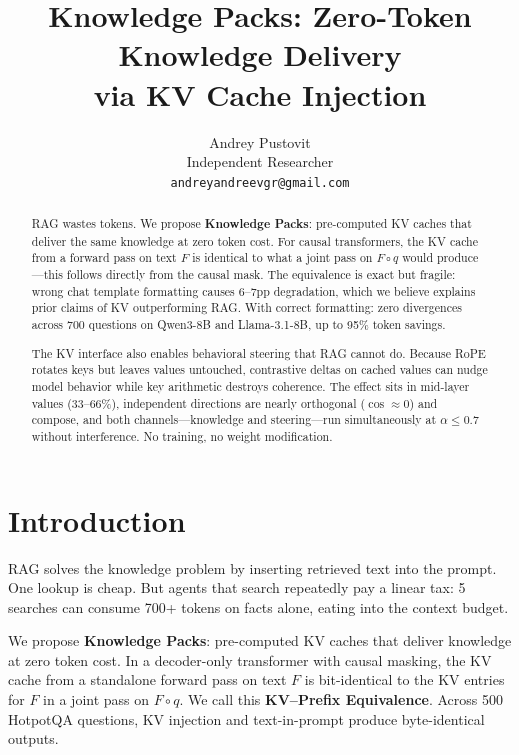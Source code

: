 \documentclass{article}
\title{Knowledge Packs: Zero-Token Knowledge Delivery\\via KV Cache Injection}
\author{
  Andrey Pustovit\\
  Independent Researcher\\
  \texttt{andreyandreevgr@gmail.com}
}
\begin{document}
\maketitle
{}

\begin{abstract}
RAG wastes tokens. We propose \textbf{Knowledge Packs}: pre-computed KV caches that deliver the same knowledge at zero token cost. For causal transformers, the KV cache from a forward pass on text $F$ is identical to what a joint pass on $F \circ q$ would produce---this follows directly from the causal mask. The equivalence is exact but fragile: wrong chat template formatting causes 6--7pp degradation, which we believe explains prior claims of KV outperforming RAG. With correct formatting: zero divergences across 700 questions on Qwen3-8B and Llama-3.1-8B, up to 95\% token savings.

The KV interface also enables behavioral steering that RAG cannot do. Because RoPE rotates keys but leaves values untouched, contrastive deltas on cached values can nudge model behavior while key arithmetic destroys coherence. The effect sits in mid-layer values (33--66\%), independent directions are nearly orthogonal ($\cos \approx 0$) and compose, and both channels---knowledge and steering---run simultaneously at $\alpha{\leq}0.7$ without interference. No training, no weight modification.
\end{abstract}

\section{Introduction}

RAG \citep{lewis2020rag, guu2020realm} solves the knowledge problem by inserting retrieved text into the prompt. One lookup is cheap. But agents that search repeatedly pay a linear tax: 5 searches can consume 700+ tokens on facts alone, eating into the context budget.

We propose \textbf{Knowledge Packs}: pre-computed KV caches that deliver knowledge at zero token cost. In a decoder-only transformer with causal masking, the KV cache from a standalone forward pass on text $F$ is bit-identical to the KV entries for $F$ in a joint pass on $F \circ q$. We call this \textbf{KV--Prefix Equivalence}. Across 500 HotpotQA questions, KV injection and text-in-prompt produce byte-identical outputs.
\end{document}
